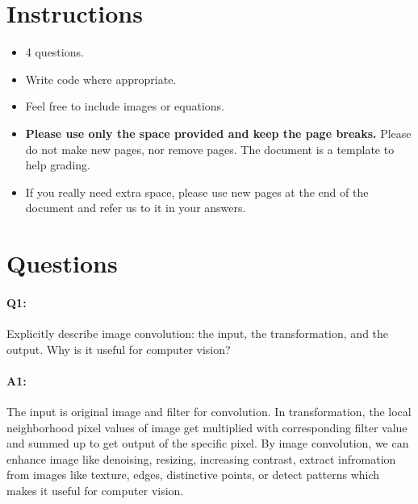 	\maketitle
	\vspace{-3cm}
	\thispagestyle{fancy}
	
	\section*{Instructions}
	\begin{itemize}
		\item 4 questions.
		\item Write code where appropriate.
		\item Feel free to include images or equations.
		\item \textbf{Please use only the space provided and keep the page breaks.} Please do not make new pages, nor remove pages. The document is a template to help grading.
		\item If you really need extra space, please use new pages at the end of the document and refer us to it in your answers.
	\end{itemize}

	\section*{Questions}
	
	\paragraph{Q1:} Explicitly describe image convolution: the input, the transformation, and the output. Why is it useful for computer vision?
	
	\paragraph{A1:} The input is original image and filter for convolution. In transformation, the local neighborhood pixel values of image get multiplied with corresponding filter value and summed up to get output of the specific pixel. By image convolution, we can enhance image like denoising, resizing, increasing contrast, extract infromation from images like texture, edges, distinctive points, or detect patterns which makes it useful for computer vision. 
	
	
	
	

